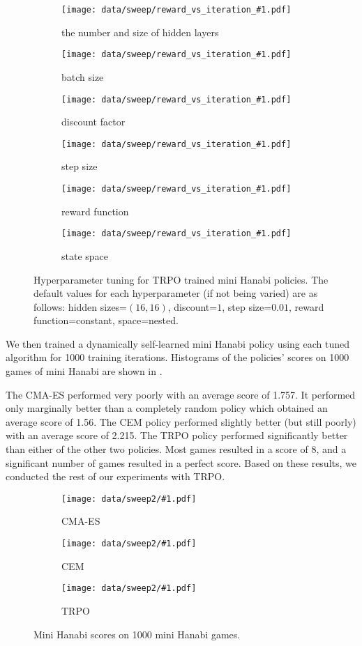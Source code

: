 \begin{figure}[ht]
  \newcommand{\hyperparamsubfig}[3]{%
    \begin{subfigure}[t]{0.32\textwidth}
      \centering
      \texttt{[image: data/sweep/reward\_vs\_iteration\_\#1.pdf]}
      \caption{#2}\label{fig:#3}
    \end{subfigure}
  }

  \centering

  \hyperparamsubfig{hidden_sizes}{the number and size of hidden layers}{}
  \hyperparamsubfig{batch_size}{batch size}{}
  \hyperparamsubfig{discount}{discount factor}{}

  \hyperparamsubfig{step_size}{step size}{}
  \hyperparamsubfig{reward}{reward function}{}
  \hyperparamsubfig{space}{state space}{}

  \caption{
    Hyperparameter tuning for TRPO trained mini Hanabi policies. The default
    values for each hyperparameter (if not being varied) are as follows: hidden
    sizes=$(16, 16)$, discount=$1$, step size=$0.01$, reward function=constant,
    space=nested.
  }\label{fig:trpo-tuning}
\end{figure}

We then trained a dynamically self-learned mini Hanabi policy using each
tuned algorithm for 1000 training iterations. Histograms of the policies'
scores on 1000 games of mini Hanabi are shown in .

The CMA-ES performed very poorly with an average score of 1.757. It performed
only marginally better than a completely random policy which obtained an
average score of 1.56.
%
The CEM policy performed slightly better (but still poorly) with an average
score of 2.215.
%
The TRPO policy performed significantly better than either of the other two
policies. Most games resulted in a score of 8, and a significant number of
games resulted in a perfect score.
%
Based on these results, we conducted the rest of our experiments with TRPO.

\begin{figure}[ht]
  \newcommand{\algosubfig}[3]{%
    \begin{subfigure}[b]{0.32\textwidth}
      \centering
      \texttt{[image: data/sweep2/\#1.pdf]}
      \caption{#2}\label{fig:#3}
    \end{subfigure}
  }

  \centering
  \algosubfig{CMA-ES}{CMA-ES}{cmaes}
  \algosubfig{CEM}{CEM}{cem}
  \algosubfig{TRPO}{TRPO}{trpo}
  \caption{Mini Hanabi scores on 1000 mini Hanabi games.}\label{fig:algos}
\end{figure}

